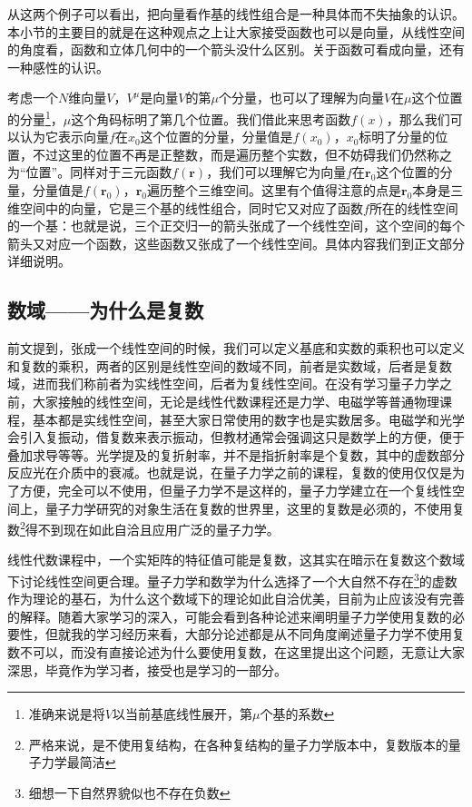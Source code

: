 \documentclass[../../main.tex]{subfiles}
\begin{document}
从这两个例子可以看出，把向量看作基的线性组合是一种具体而不失抽象的认识。本小节的主要目的就是在这种观点之上让大家接受函数也可以是向量，从线性空间的角度看，函数和立体几何中的一个箭头没什么区别。关于函数可看成向量，还有一种感性的认识。

考虑一个\(N\)维向量\(V\)，\(V^\mu\)是向量\(V\)的第\(\mu\)个分量，也可以了理解为向量\(V\)在\(\mu\)这个位置的分量\footnote{准确来说是将\(V\)以当前基底线性展开，第\(\mu\)个基的系数}，\(\mu\)这个角码标明了第几个位置。我们借此来思考函数\(f(x)\)，那么我们可以认为它表示向量\(f\)在\(x_0\)这个位置的分量，分量值是\(f(x_0)\)，\(x_0\)标明了分量的位置，不过这里的位置不再是正整数，而是遍历整个实数，但不妨碍我们仍然称之为“位置”。同样对于三元函数\(f(\mathbf{r})\)，我们可以理解它为向量\(f\)在\(\mathbf{r}_0\)这个位置的分量，分量值是\(f(\mathbf{r}_0)\)，\(\mathbf{r}_0\)遍历整个三维空间。这里有个值得注意的点是\(\mathbf{r}_0\)本身是三维空间中的向量，它是三个基的线性组合，同时它又对应了函数\(f\)所在的线性空间的一个基：也就是说，三个正交归一的箭头张成了一个线性空间，这个空间的每个箭头又对应一个函数，这些函数又张成了一个线性空间。具体内容我们到正文部分详细说明。

\subsection{数域——为什么是复数}
前文提到，张成一个线性空间的时候，我们可以定义基底和实数的乘积也可以定义和复数的乘积，两者的区别是线性空间的数域不同，前者是实数域，后者是复数域，进而我们称前者为实线性空间，后者为复线性空间。在没有学习量子力学之前，大家接触的线性空间，无论是线性代数课程还是力学、电磁学等普通物理课程，基本都是实线性空间，甚至大家日常使用的数字也是实数居多。电磁学和光学会引入复振动，借复数来表示振动，但教材通常会强调这只是数学上的方便，便于叠加求导等等。光学提及的复折射率，并不是指折射率是个复数，其中的虚数部分反应光在介质中的衰减。也就是说，在量子力学之前的课程，复数的使用仅仅是为了方便，完全可以不使用，但量子力学不是这样的，量子力学建立在一个复线性空间上，量子力学研究的对象生活在复数的世界里，这里的复数是必须的，不使用复数\footnote{严格来说，是不使用复结构，在各种复结构的量子力学版本中，复数版本的量子力学最简洁}得不到现在如此自洽且应用广泛的量子力学。

线性代数课程中，一个实矩阵的特征值可能是复数，这其实在暗示在复数这个数域下讨论线性空间更合理。量子力学和数学为什么选择了一个大自然不存在\footnote{细想一下自然界貌似也不存在负数}的虚数作为理论的基石，为什么这个数域下的理论如此自洽优美，目前为止应该没有完善的解释。随着大家学习的深入，可能会看到各种论述来阐明量子力学使用复数的必要性，但就我的学习经历来看，大部分论述都是从不同角度阐述量子力学不使用复数不可以，而没有直接论述为什么要使用复数，在这里提出这个问题，无意让大家深思，毕竟作为学习者，接受也是学习的一部分。
\end{document}
